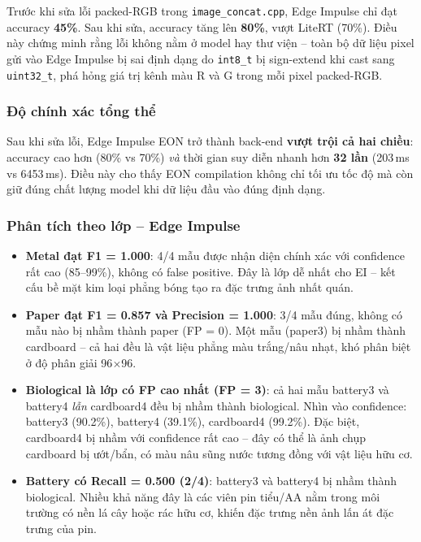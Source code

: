 \documentclass[12pt,a4paper]{article}
\begin{document}
Trước khi sửa lỗi packed-RGB trong \texttt{image\_concat.cpp}, Edge Impulse chỉ đạt accuracy \textbf{45\%}. Sau khi sửa, accuracy tăng lên \textbf{80\%}, vượt LiteRT (70\%). Điều này chứng minh rằng lỗi không nằm ở model hay thư viện -- toàn bộ dữ liệu pixel gửi vào Edge Impulse bị sai định dạng do \texttt{int8\_t} bị sign-extend khi cast sang \texttt{uint32\_t}, phá hỏng giá trị kênh màu R và G trong mỗi pixel packed-RGB.

\subsubsection*{Độ chính xác tổng thể}

Sau khi sửa lỗi, Edge Impulse EON trở thành back-end \textbf{vượt trội cả hai chiều}: accuracy cao hơn (80\% vs 70\%) \emph{và} thời gian suy diễn nhanh hơn \textbf{32 lần} (203\,ms vs 6453\,ms). Điều này cho thấy EON compilation không chỉ tối ưu tốc độ mà còn giữ đúng chất lượng model khi dữ liệu đầu vào đúng định dạng.

\subsubsection*{Phân tích theo lớp -- Edge Impulse}

\begin{itemize}
  \item \textbf{Metal đạt F1 = 1.000}: 4/4 mẫu được nhận diện chính xác với confidence rất cao (85--99\%), không có false positive. Đây là lớp dễ nhất cho EI -- kết cấu bề mặt kim loại phẳng bóng tạo ra đặc trưng ảnh nhất quán.

  \item \textbf{Paper đạt F1 = 0.857 và Precision = 1.000}: 3/4 mẫu đúng, không có mẫu nào bị nhầm thành paper (FP = 0). Một mẫu (paper3) bị nhầm thành cardboard -- cả hai đều là vật liệu phẳng màu trắng/nâu nhạt, khó phân biệt ở độ phân giải 96$\times$96.

  \item \textbf{Biological là lớp có FP cao nhất (FP = 3)}: cả hai mẫu battery3 và battery4 \emph{lẫn} cardboard4 đều bị nhầm thành biological. Nhìn vào confidence: battery3 (90.2\%), battery4 (39.1\%), cardboard4 (99.2\%). Đặc biệt, cardboard4 bị nhầm với confidence rất cao -- đây có thể là ảnh chụp cardboard bị ướt/bẩn, có màu nâu sũng nước tương đồng với vật liệu hữu cơ.

  \item \textbf{Battery có Recall = 0.500 (2/4)}: battery3 và battery4 bị nhầm thành biological. Nhiều khả năng đây là các viên pin tiểu/AA nằm trong môi trường có nền lá cây hoặc rác hữu cơ, khiến đặc trưng nền ảnh lấn át đặc trưng của pin.
\end{itemize}
\end{document}

